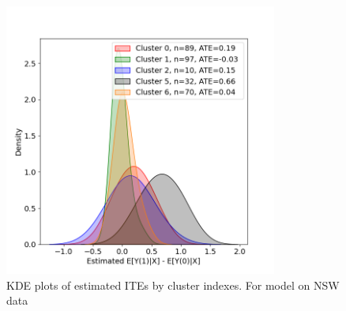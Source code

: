 \documentclass{article}
\begin{document}
\begin{figure}[H]
  \centering
  \includegraphics[width=0.8\textwidth]{Plots/NSW_output_histogram.png}
  \caption{KDE plots of estimated ITEs by cluster indexes. For model on NSW data}
  \label{fig:nsw_histo}
\end{figure}



\printbibliography
\end{document}
